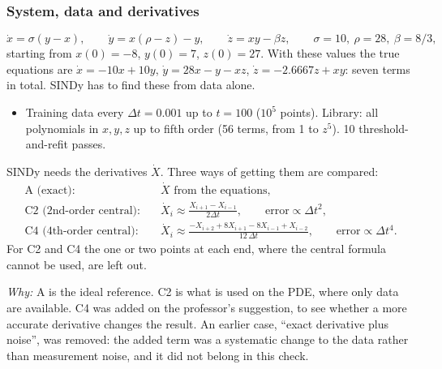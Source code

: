 \documentclass[11pt,a4paper]{article}
\newcommand{\why}{\textit{Why:} }
\begin{document}
\subsubsection{System, data and derivatives}
\begin{equation}
  \dot x=\sigma(y-x),\qquad \dot y = x(\rho-z)-y,\qquad \dot z=xy-\beta z,\qquad
  \sigma=10,\ \rho=28,\ \beta=8/3,
\end{equation}
starting from $x(0)=-8$, $y(0)=7$, $z(0)=27$. With these values the true equations are $\dot x=-10x+10y$, $\dot y=28x-y-xz$, $\dot z=-2.6667z+xy$: seven terms in total. SINDy has to find these from data alone.
\begin{itemize}
  \item Training data every $\Delta t=0.001$ up to $t=100$ ($10^5$ points). Library: all polynomials in $x,y,z$ up to fifth order (56 terms, from 1 to $z^5$). 10 threshold-and-refit passes.
\end{itemize}
SINDy needs the derivatives $\dot X$. Three ways of getting them are compared:
\begin{align*}
  \text{A (exact):}\quad & \dot X \text{ from the equations},\\
  \text{C2 (2nd-order central):}\quad & \dot X_i \approx \frac{X_{i+1}-X_{i-1}}{2\Delta t}, \qquad \text{error} \propto \Delta t^2,\\
  \text{C4 (4th-order central):}\quad & \dot X_i \approx \frac{-X_{i+2}+8X_{i+1}-8X_{i-1}+X_{i-2}}{12\,\Delta t}, \qquad \text{error}\propto\Delta t^4 .
\end{align*}
For C2 and C4 the one or two points at each end, where the central formula cannot be used, are left out.

\why A is the ideal reference. C2 is what is used on the PDE, where only data are available. C4 was added on the professor's suggestion, to see whether a more accurate derivative changes the result. An earlier case, ``exact derivative plus noise'', was removed: the added term was a systematic change to the data rather than measurement noise, and it did not belong in this check.

\begin{table}[H]\centering\small

\caption{Lorenz coefficients of the selected model (the 7-term model, chosen in Section~\ref{sec:lorenz-apply}). All three cases find exactly the 7 true terms; all other 161 coefficients are zero. The last row is the maximum coefficient error (Section~\ref{sec:lorenz-err}). The 4th-order differences are about $10^4$ times more accurate than the 2nd-order ones.}
\label{tab:lorenz-coefs}
\end{table}
\end{document}
